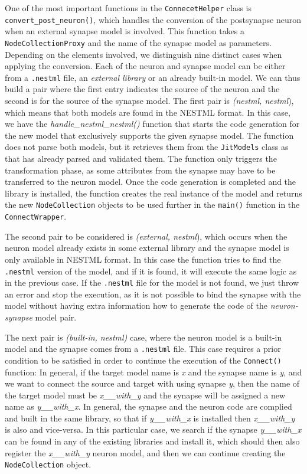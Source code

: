 One of the most important functions in the \texttt{ConnecetHelper} class is \texttt{convert\_post\_neuron()}, which handles the conversion of the postsynapse neuron when an external synapse model is involved. This function takes a \texttt{NodeCollectionProxy} and the name of the synapse model as parameters. Depending on the elements involved, we distinguish nine distinct cases when applying the conversion. Each of the neuron and synapse model can be either from a \texttt{.nestml} file, an \emph{external library} or an already built-in model. We can thus build a pair where the first entry indicates the source of the neuron and the second is for the source of the synapse model. The first pair is \emph{(nestml, nestml}), which means that both models are found in the NESTML format. In this case, we have the \emph{handle\_nestml\_nestml()} function that starts the code generation for the new model that exclusively supports the given synapse model. The function does not parse both models, but it retrieves them from the \texttt{JitModels} class as that has already parsed and validated them. The function only triggers the transformation phase, as some attributes from the synapse may have to be transferred to the neuron model. Once the code generation is completed and the library is installed, the function creates the real instance of the model and returns the new \texttt{NodeCollection} objects to be used further in the \texttt{main()} function in the \texttt{ConnectWrapper}.

The second pair to be considered is \emph{(external, nestml}), which occurs when the neuron model already exists in some external library and the synapse model is only available in NESTML format. In this case the function tries to find the \texttt{.nestml} version of the model, and if it is found, it will execute the same logic as in the previous case. If the \texttt{.nestml} file for the model is not found, we just throw an error and stop the execution, as it is not possible to bind the synapse with the model without having extra information how to generate the code of the \emph{neuron-synapse} model pair.

The next pair is \emph{(built-in, nestml)} case, where the neuron model is a built-in model and the synapse comes from a \texttt{.nestml} file. This case requires a prior condition to be satisfied in order to continue the execution of the \texttt{Connect()} function: In general, if the target model name is \emph{x} and the synapse name is \emph{y}, and we want to connect the source and target with using synapse \emph{y}, then the name of the target model must be \emph{x\_\_with\_y} and the synapse will be assigned a new name as \emph{y\_\_with\_x}. In general, the synapse and the neuron code are complied and built in the same library, so that if \emph{y\_\_with\_x} is installed then \emph{x\_\_with\_y} is also and vice-versa. In this particular case, we search if the synapse \emph{y\_\_with\_x} can be found in any of the existing libraries and install it, which should then also register the \emph{x\_\_with\_y} neuron model, and then we can continue creating the \texttt{NodeCollection} object.

